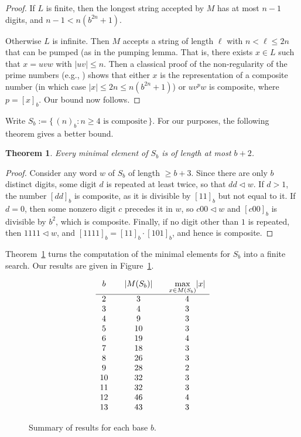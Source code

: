 \documentclass[12pt]{article}
\def\subw{\mathrel{\triangleleft}}
\theoremstyle{plain}
\newtheorem{theorem}{Theorem}
\theoremstyle{definition}
\theoremstyle{remark}
\newcommand{\0}{\mathtt{0}}
\newcommand{\1}{\mathtt{1}}
\newcommand{\2}{\mathtt{2}}
\newcommand{\3}{\mathtt{3}}
\newcommand{\4}{\mathtt{4}}
\newcommand{\5}{\mathtt{5}}
\newcommand{\6}{\mathtt{6}}
\newcommand{\7}{\mathtt{7}}
\newcommand{\8}{\mathtt{8}}
\newcommand{\9}{\mathtt{9}}
\newcommand{\set}[2]{\{\,#1{}:{}#2\,\}}
\begin{document}
\begin{proof}
If $L$ is finite, then the longest string accepted by $M$ has
at most $n-1$ digits, and $n-1 < n(b^{2n} + 1)$.

Otherwise $L$ is infinite.  Then $M$ accepts a string of length
$\ell$ with $n < \ell \leq 2n$ that can be pumped (as in the
pumping lemma.  That is, there exists $x \in L$ such that
$x = uvw$ with $|uv| \leq n$.  Then a classical proof of the
non-regularity of the prime numbers 
(e.g., \cite[Example 3.2, p.\ 57]{HU79})
shows that either $x$ is the representation of a composite 
number (in which case $|x| \leq 2n \leq n(b^{2n} + 1)$)
or $u v^p w$ is composite, where $p = [x]_b$.  
Our bound now follows.
\end{proof}

Write $S_b := \set{(n)_b}{\text{$n \geq 4$ is composite}}$.
For our purposes, the following theorem gives a better bound.

\begin{theorem}
Every minimal element of $S_b$ is of length at most $b+2$.
\label{devi}
\end{theorem}

\begin{proof}
Consider any word $w$ of $S_b$ of length $\geq b+3$.   Since there are only
$b$ distinct digits, some digit $d$ is repeated at least twice,
so that $dd \subw w$.  If $d > 1$, the number $[dd]_b$ is composite,
as it is divisible by $[11]_b$ but not equal to it.  If $d = 0$,
then some nonzero digit $c$ precedes it in $w$, so $c00 \subw w$
and $[c00]_b$ is divisible by $b^2$, which is composite.
Finally, if no digit other than $1$ is repeated, then 
$1111 \subw w$, and $[1111]_b = [11]_b \cdot [101]_b$, and hence
is composite.
\end{proof}

Theorem~\ref{devi} turns the computation of the minimal elements for
$S_b$ into a finite search.  Our results are given in Figure~\ref{ttwo}.

\begin{figure}\[\begin{array}{c@{\qquad}c@{\qquad}c}
b & \lvert M(S_b)\rvert & \max\limits_{x\in M(S_b)}\lvert x\rvert \\ \hline
2 & 3 & 4 \\
3 & 4 & 3 \\
4 & 9 & 3 \\
5 & 10 & 3 \\
6 & 19 & 4 \\
7 & 18 & 3\\
8 & 26 & 3 \\
9 & 28 & 2 \\
10 & 32 & 3 \\
11 & 32 & 3\\
12 & 46 & 4 \\
13 & 43 & 3
\end{array}\]
\caption{Summary of results for each base $b$.}
\label{ttwo}
\end{figure}
\end{document}
